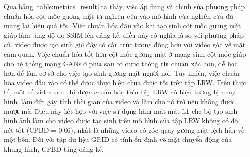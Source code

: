 Qua bảng \ref{table:metrics_result} ta thấy, việc áp dụng và chỉnh sửa phương pháp chuẩn hóa cột mốc gương mặt từ nghiên cứu \cite{gen_face_landmark} vào mô hình của nghiên cứu \cite{chen2019} đã mang lại hiệu quả tốt. Việc chuẩn hóa đầu vào khi tạo sinh cột mốc gương mặt giúp làm tăng độ đo SSIM lên đáng kể, điều này có nghĩa là so với phương pháp cũ, video được tạo sinh giờ đây có cấu trúc tương đồng hơn với video gốc về mặt cảm quan. Việc chuẩn hóa tốt hơn cột mốc gương mặt ở mạng sinh cột mốc giúp cho hệ thống mạng GANs ở phía sau có được thông tin chuẩn xác hơn, dễ học hơn để làm cơ sở cho việc tạo sinh gương mặt người nói. Tuy nhiên, việc chuẩn hóa video đầu vào có thể được thực hiện chưa được tốt trên tập LRW. Trên thực tế, một số video sau khi được chuẩn hóa trên tập LRW có hiện tượng bị nhảy hình, làm đứt gãy tính thời gian của video và làm cho nó trở nên không được mượt mà. Điều này kết hợp với việc sử dụng hàm mất mát L1 cho bộ tạo sinh hình ảnh làm cho video được tạo sinh trên mô hình của tập LRW không có độ nét tốt (CPBD = 0.06), nhất là những video có góc quay gương mặt lệch hẳn về một bên. Đối với tập dữ liệu GRID có tính ổn định về mặt chuyển động của khung hình, CPBD tăng đáng kể.
